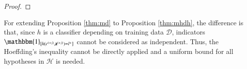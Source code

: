 \documentclass{article}
\begin{document}
\begin{proof}
\end{proof}


For extending Proposition \ref{thm:md} to Proposition \ref{thm:mhdh}, the difference is that, since $h$ is a classifier depending on training data $\mathcal{D}$, indicators $\mathbbm{1}_{[h(c^{(+j)},\mathbf{z}^{(+j)})=l^{+}]}$ cannot be considered as independent. Thus, the Hoeffding's inequality cannot be directly applied and a uniform bound for all hypotheses in $\mathcal{H}$ is needed.
\end{document}
